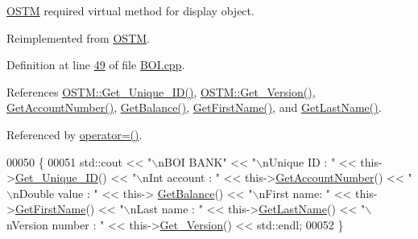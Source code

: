 \hyperlink{class_o_s_t_m}{O\+S\+TM} required virtual method for display object. 



Reimplemented from \hyperlink{class_o_s_t_m_a513396a115f2987fd07c203309ae8a59_a513396a115f2987fd07c203309ae8a59}{O\+S\+TM}.



Definition at line \hyperlink{_b_o_i_8cpp_source_l00049}{49} of file \hyperlink{_b_o_i_8cpp_source}{B\+O\+I.\+cpp}.



References \hyperlink{_o_s_t_m_8cpp_source_l00073}{O\+S\+T\+M\+::\+Get\+\_\+\+Unique\+\_\+\+I\+D()}, \hyperlink{_o_s_t_m_8cpp_source_l00089}{O\+S\+T\+M\+::\+Get\+\_\+\+Version()}, \hyperlink{_b_o_i_8cpp_source_l00073}{Get\+Account\+Number()}, \hyperlink{_b_o_i_8cpp_source_l00065}{Get\+Balance()}, \hyperlink{_b_o_i_8cpp_source_l00089}{Get\+First\+Name()}, and \hyperlink{_b_o_i_8cpp_source_l00081}{Get\+Last\+Name()}.



Referenced by \hyperlink{_b_o_i_8h_source_l00065}{operator=()}.


\begin{DoxyCode}
00050 \{
00051    std::cout << \textcolor{stringliteral}{"\(\backslash\)nBOI BANK"} << \textcolor{stringliteral}{"\(\backslash\)nUnique ID : "} << this->\hyperlink{class_o_s_t_m_a5a01a8b98d16b1d1904ecf9356e7b71d_a5a01a8b98d16b1d1904ecf9356e7b71d}{Get\_Unique\_ID}() << \textcolor{stringliteral}{"\(\backslash\)nInt account : 
      "} << this->\hyperlink{class_b_o_i_a5b18e1538f3d37835234946cdf9f240f_a5b18e1538f3d37835234946cdf9f240f}{GetAccountNumber}() << \textcolor{stringliteral}{"\(\backslash\)nDouble value : "} << this->
      \hyperlink{class_b_o_i_a25b289dece2a1685bb9d1a9332c9be0b_a25b289dece2a1685bb9d1a9332c9be0b}{GetBalance}() << \textcolor{stringliteral}{"\(\backslash\)nFirst name: "} << this->\hyperlink{class_b_o_i_ab4b9d50c6008a666aa4382def580e7d1_ab4b9d50c6008a666aa4382def580e7d1}{GetFirstName}() << \textcolor{stringliteral}{"\(\backslash\)nLast name : "} << 
      this->\hyperlink{class_b_o_i_a37828f3fa4a32f522966e2cad90eaab2_a37828f3fa4a32f522966e2cad90eaab2}{GetLastName}()  << \textcolor{stringliteral}{"\(\backslash\)nVersion number : "} << this->\hyperlink{class_o_s_t_m_a1f1db9d482f22c8e7caa17dfb340626b_a1f1db9d482f22c8e7caa17dfb340626b}{Get\_Version}() << std::endl;
00052 \}
\end{DoxyCode}


